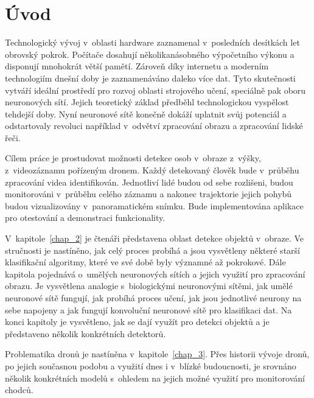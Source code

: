 
\chapter{Úvod}
\label{chap_1}

Technologický vývoj v~oblasti hardware zaznamenal v~posledních desítkách let obrovský pokrok. Počítače dosahují několikanásobného výpočetního výkonu a disponují mnohokrát větší pamětí. Zároveň díky internetu a moderním technologiím dnešní doby je zaznamenáváno daleko více dat. Tyto skutečnosti vytváří ideální prostředí pro rozvoj oblasti strojového učení, speciálně pak oboru neuronových sítí. Jejich teoretický základ předběhl technologickou vyspělost tehdejší doby. Nyní neuronové sítě konečně dokáží uplatnit svůj potenciál a odstartovaly revoluci například v~odvětví zpracování obrazu a zpracování lidské řeči.

Cílem práce je prostudovat možnosti detekce osob v~obraze z~výšky, z~videozáznamu pořízeným dronem. Každý detekovaný člověk bude v~průběhu zpracování videa identifikován. Jednotliví lidé budou od sebe rozlišeni, budou monitorováni v~průběhu celého záznamu a nakonec trajektorie jejich pohybů budou vizualizovány v~panoramatickém snímku. Bude implementována aplikace pro otestování a demonstraci funkcionality.

V~kapitole~\ref{chap_2} je čtenáři představena oblast detekce objektů v~obraze. Ve stručnosti je nastíněno, jak celý proces probíhá a jsou vysvětleny některé starší klasifikační algoritmy, které ve své době byly významné až pokrokové. Dále kapitola pojednává o~umělých neuronových sítích a jejich využití pro zpracování obrazu. Je vysvětlena analogie s~biologickými neuronovými sítěmi, jak umělé neuronové sítě fungují, jak probíhá proces učení, jak jsou jednotlivé neurony na sebe napojeny a jak fungují konvoluční neuronové sítě pro klasifikaci dat. Na konci kapitoly je vysvětleno, jak se dají využít pro detekci objektů a je představeno několik konkrétních detektorů.

Problematika dronů je nastíněna v~kapitole~\ref{chap_3}. Přes historii vývoje dronů, po jejich současnou podobu a využití dnes i v~blízké budoucnosti, je srovnáno několik konkrétních modelů s~ohledem na jejich možné využití pro monitorování chodců.

